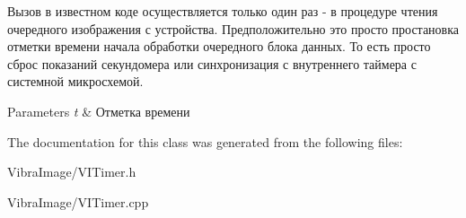 Вызов в известном коде осуществляется только один раз -\/ в процедуре чтения очередного изображения с устройства. Предположительно это просто простановка отметки времени начала обработки очередного блока данных. То есть просто сброс показаний секундомера или синхронизация с внутреннего таймера с системной микросхемой. 


\begin{DoxyParams}{Parameters}
{\em t} & Отметка времени\\
\hline
\end{DoxyParams}


The documentation for this class was generated from the following files\+:\begin{DoxyCompactItemize}
\item 
Vibra\+Image/V\+I\+Timer.\+h\item 
Vibra\+Image/V\+I\+Timer.\+cpp\end{DoxyCompactItemize}
